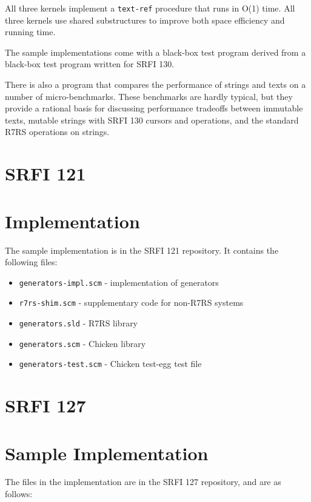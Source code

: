 All three kernels implement a \texttt{text-ref} procedure that runs in
O(1) time. All three kernels use shared substructures to improve both
space efficiency and running time.

The sample implementations come with a black-box test program derived
from a black-box test program written for SRFI 130.

There is also a program that compares the performance of strings and
texts on a number of micro-benchmarks. These benchmarks are hardly
typical, but they provide a rational basis for discussing performance
tradeoffs between immutable texts, mutable strings with SRFI 130 cursors
and operations, and the standard R7RS operations on strings.

\section{SRFI 121}

\section{Implementation}\label{implementation}

The sample implementation is in the SRFI 121 repository. It contains the
following files:

\begin{itemize}
\tightlist
\item
  \texttt{generators-impl.scm} - implementation of generators
\item
  \texttt{r7rs-shim.scm} - supplementary code for non-R7RS systems
\item
  \texttt{generators.sld} - R7RS library
\item
  \texttt{generators.scm} - Chicken library
\item
  \texttt{generators-test.scm} - Chicken test-egg test file
\end{itemize}

\section{SRFI 127}

\section{{Sample Implementation}}\label{sample-implementation}

The files in the implementation are in the SRFI 127 repository, and are
as follows:


